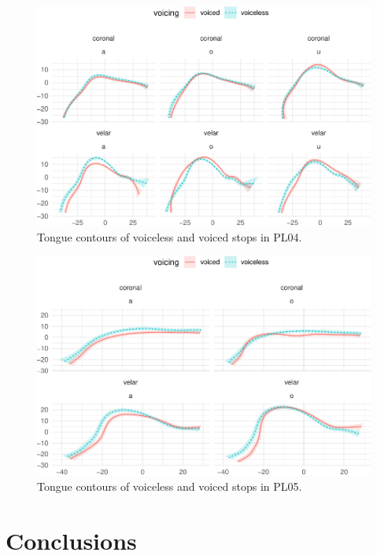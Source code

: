 \documentclass[12pt,]{article}
\begin{document}
\begin{figure}

{\centering \includegraphics[width=.8\textwidth]{2018-polar-gam_files/figure-latex/tongues-pl04-1} 

}

\caption{Tongue contours of voiceless and voiced stops in PL04.}\label{f:tongues-pl04}
\end{figure}

\begin{figure}

{\centering \includegraphics[width=.8\textwidth]{2018-polar-gam_files/figure-latex/tongues-pl05-1} 

}

\caption{Tongue contours of voiceless and voiced stops in PL05.}\label{f:tongues-pl05}
\end{figure}

\hypertarget{conclusions}{%
\section{Conclusions}\label{conclusions}}
\end{document}

